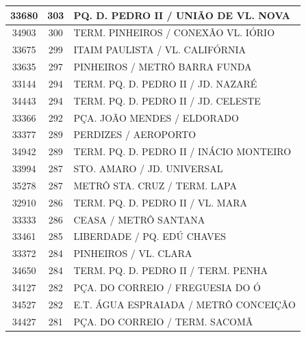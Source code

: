 \documentclass[
	12pt,				%
	oneside,			%
	a4paper,			%
	english,			%
	brazil				%
	]{abntex2ppgsi}
\begin{document}
\begin{apendicesenv}
\begin{longtable}{c|c|p{7cm}}
    33680 & 303   & PQ. D. PEDRO II / UNIÃO DE VL. NOVA \\
\hline

    34903 & 300   & TERM. PINHEIROS / CONEXÃO VL. IÓRIO \\
\hline

    33675 & 299   & ITAIM PAULISTA / VL. CALIFÓRNIA \\
\hline

    33635 & 297   & PINHEIROS / METRÔ BARRA FUNDA \\
\hline

    33144 & 294   & TERM. PQ. D. PEDRO II / JD. NAZARÉ \\
\hline

    34443 & 294   & TERM. PQ. D. PEDRO II / JD. CELESTE \\
\hline

    33366 & 292   & PÇA. JOÃO MENDES / ELDORADO \\
\hline

    33377 & 289   & PERDIZES / AEROPORTO \\
\hline

    34942 & 289   & TERM. PQ. D. PEDRO II / INÁCIO MONTEIRO \\
\hline

    33994 & 287   & STO. AMARO / JD. UNIVERSAL \\
\hline

    35278 & 287   & METRÔ STA. CRUZ / TERM. LAPA \\
\hline

    32910 & 286   & TERM. PQ. D. PEDRO II / VL. MARA \\
\hline

    33333 & 286   & CEASA / METRÔ SANTANA \\
\hline

    33461 & 285   & LIBERDADE / PQ. EDÚ CHAVES \\
\hline

    33372 & 284   & PINHEIROS / VL. CLARA \\
\hline

    34650 & 284   & TERM. PQ. D. PEDRO II / TERM. PENHA \\
\hline

    34127 & 282   & PÇA. DO CORREIO / FREGUESIA DO Ó \\
\hline

    34527 & 282   & E.T. ÁGUA ESPRAIADA / METRÔ CONCEIÇÃO \\
\hline

    34427 & 281   & PÇA. DO CORREIO / TERM. SACOMÃ \\
\hline


\end{longtable}
\end{apendicesenv}
\end{document}
